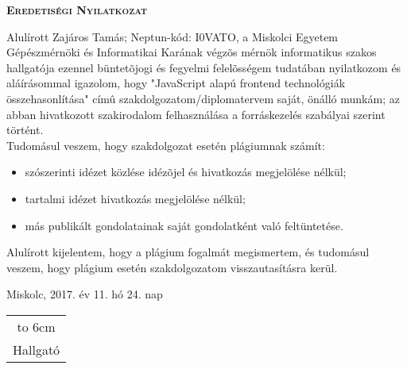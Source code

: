 \newpage

\vspace*{1cm}  
\begin{center}
\large\textsc{\bfseries Eredetiségi Nyilatkozat}
\end{center}
\vspace*{2cm}  

Alulírott Zajáros Tamás; Neptun-kód: I0VATO, a Miskolci Egyetem Gépészmérnöki és Informatikai Karának végzõs mérnök informatikus szakos hallgatója ezennel büntetõjogi és fegyelmi felelõsségem tudatában nyilatkozom és aláírásommal igazolom, hogy "JavaScript alapú frontend technológiák összehasonlítása"
címû szakdolgozatom/diplomatervem saját, önálló munkám; az abban hivatkozott szakirodalom
felhasználása a forráskezelés szabályai szerint történt.\\

Tudomásul veszem, hogy szakdolgozat esetén plágiumnak számít:
\begin{itemize}
\item szószerinti idézet közlése idézõjel és hivatkozás megjelölése nélkül;
\item tartalmi idézet hivatkozás megjelölése nélkül;
\item más publikált gondolatainak saját gondolatként való feltüntetése.
\end{itemize}

Alulírott kijelentem, hogy a plágium fogalmát megismertem, és tudomásul veszem, hogy
plágium esetén szakdolgozatom visszautasításra kerül.

\vspace*{3cm}

\noindent Miskolc, 2017. év 11. hó 24. nap

\vspace*{3cm}

\hspace*{8cm}\begin{tabular}{c}
\hbox to 6cm{\dotfill}\\
Hallgató
\end{tabular}



\newpage